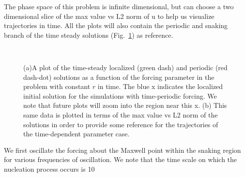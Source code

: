 \documentclass[pre,preprint,superscriptaddress]{revtex4-1}
\begin{document}
The phase space of this problem is infinite dimensional, but can choose a two dimensional slice of the max value vs L2 norm of u to help us visualize trajectories in time.  All the plots will also contain the periodic and snaking branch of the time steady solutions (Fig.~\ref{fig:NormMaxBack}) as reference.  

\begin{figure}[h]
  \begin{center}
    \mbox{
       \quad
      }
    \caption{(a)A plot of the time-steady localized (green dash) and periodic (red dash-dot) solutions as a function of the forcing parameter in the problem with constant $r$ in time.  The blue x indicates the localized initial solution for the simulations with time-periodic forcing.  We note that future plots will zoom into the region near this x.  (b) This same data is plotted in terms of the max value vs L2 norm of the solutions in order to provide some reference for the trajectories of the time-dependent parameter case. }
    \label{fig:NormMaxBack}
  \end{center}
\end{figure} 

We first oscillate the forcing about the Maxwell point within the snaking region for various frequencies of oscillation.  We note that the time scale on which the nucleation process occurs is 10



\end{document}
